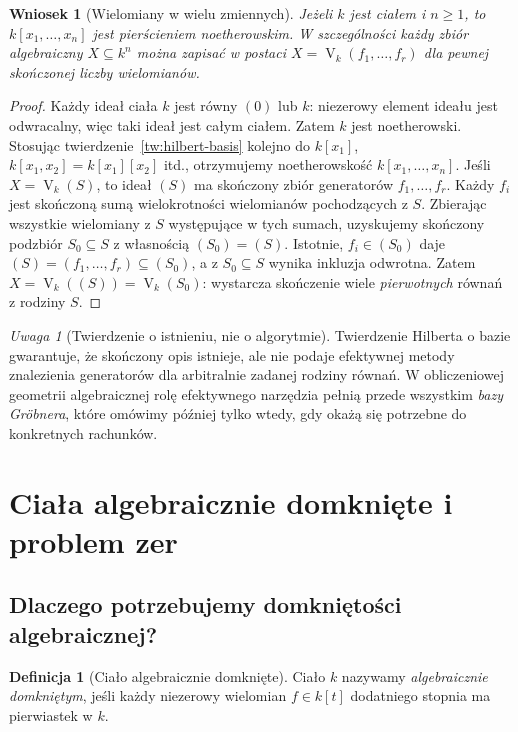 \documentclass[11pt,a4paper,openany]{report}
\numberwithin{equation}{section}
\theoremstyle{plain}
\newtheorem{wniosek}[twierdzenie]{Wniosek}
\theoremstyle{definition}
\newtheorem{definicja}[twierdzenie]{Definicja}
\theoremstyle{remark}
\newtheorem{uwaga}[twierdzenie]{Uwaga}
\newcommand{\V}{\operatorname V}
\begin{document}
\begin{wniosek}[Wielomiany w wielu zmiennych]
\label{wn:noetherian-polys}
Jeżeli $k$ jest ciałem i $n\ge1$, to $k[x_1,\dots,x_n]$
jest pierścieniem noetherowskim. W szczególności każdy zbiór
algebraiczny $X\subseteq k^n$ można zapisać w postaci
$X=\V_k(f_1,\dots,f_r)$ dla pewnej skończonej liczby wielomianów.
\end{wniosek}
\begin{proof}
Każdy ideał ciała $k$ jest równy $(0)$ lub $k$:
niezerowy element ideału jest odwracalny, więc taki ideał jest całym
ciałem. Zatem $k$ jest noetherowski.
Stosując twierdzenie~\ref{tw:hilbert-basis} kolejno do
$k[x_1]$, $k[x_1,x_2]=k[x_1][x_2]$ itd., otrzymujemy
noetherowskość $k[x_1,\dots,x_n]$.
Jeśli $X=\V_k(S)$, to ideał $(S)$ ma skończony zbiór
generatorów $f_1,\dots,f_r$. Każdy $f_i$ jest skończoną
sumą wielokrotności wielomianów pochodzących z $S$.
Zbierając wszystkie wielomiany z $S$ występujące w tych
sumach, uzyskujemy skończony podzbiór $S_0\subseteq S$
z własnością $(S_0)=(S)$. Istotnie, $f_i\in(S_0)$ daje
$(S)=(f_1,\dots,f_r)\subseteq(S_0)$, a z $S_0\subseteq S$
wynika inkluzja odwrotna. Zatem
$X=\V_k((S))=\V_k(S_0)$: wystarcza skończenie wiele
\emph{pierwotnych} równań z rodziny $S$.
\end{proof}

\begin{uwaga}[Twierdzenie o istnieniu, nie o algorytmie]
Twierdzenie Hilberta o bazie gwarantuje, że skończony opis istnieje,
ale nie podaje efektywnej metody znalezienia generatorów dla
arbitralnie zadanej rodziny równań. W obliczeniowej geometrii
algebraicznej rolę efektywnego narzędzia pełnią przede wszystkim
\emph{bazy Gröbnera}, które omówimy później tylko wtedy,
gdy okażą się potrzebne do konkretnych rachunków.
\end{uwaga}

\section{Ciała algebraicznie domknięte i problem zer}

\subsection{Dlaczego potrzebujemy domkniętości algebraicznej?}

\begin{definicja}[Ciało algebraicznie domknięte]
Ciało $k$ nazywamy \emph{algebraicznie domkniętym}, jeśli każdy
niezerowy wielomian $f\in k[t]$ dodatniego stopnia ma pierwiastek w $k$.
\end{definicja}
\end{document}
